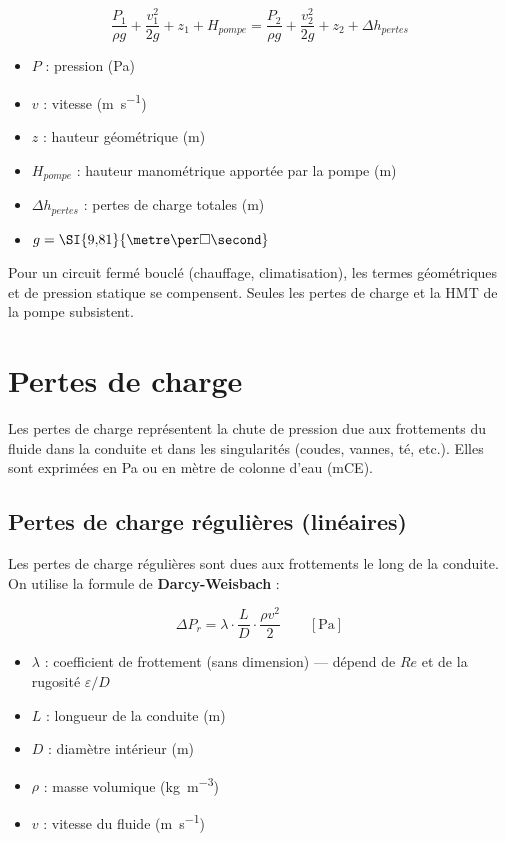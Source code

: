 \begin{equation}
  \frac{P_1}{\rho g} + \frac{v_1^2}{2g} + z_1 + H_{pompe} = \frac{P_2}{\rho g} + \frac{v_2^2}{2g} + z_2 + \Delta h_{pertes}
  \label{eq:bernoulli}
\end{equation}
\begin{itemize}
  \item $P$ : pression (\si{\pascal})
  \item $v$ : vitesse (\si{\metre\per\second})
  \item $z$ : hauteur géométrique (\si{\metre})
  \item $H_{pompe}$ : hauteur manométrique apportée par la pompe (\si{\metre})
  \item $\Delta h_{pertes}$ : pertes de charge totales (\si{\metre})
  \item $g = \SI{9{,}81}{\metre\per\square\second}$
\end{itemize}

Pour un circuit fermé bouclé (chauffage, climatisation), les termes géométriques et de pression statique se compensent. Seules les pertes de charge et la HMT de la pompe subsistent.

\section{Pertes de charge}

Les pertes de charge représentent la chute de pression due aux frottements du fluide dans la conduite et dans les singularités (coudes, vannes, té, etc.). Elles sont exprimées en \si{\pascal} ou en mètre de colonne d'eau (\si{mCE}).

\subsection{Pertes de charge régulières (linéaires)}

Les pertes de charge régulières sont dues aux frottements le long de la conduite. On utilise la formule de \textbf{Darcy-Weisbach} :

\begin{equation}
  \Delta P_r = \lambda \cdot \frac{L}{D} \cdot \frac{\rho v^2}{2} \qquad \left[\si{\pascal}\right]
  \label{eq:darcy}
\end{equation}
\begin{itemize}
  \item $\lambda$ : coefficient de frottement (sans dimension) — dépend de $Re$ et de la rugosité $\varepsilon/D$
  \item $L$ : longueur de la conduite (\si{\metre})
  \item $D$ : diamètre intérieur (\si{\metre})
  \item $\rho$ : masse volumique (\si{\kilogram\per\cubic\metre})
  \item $v$ : vitesse du fluide (\si{\metre\per\second})
\end{itemize}


